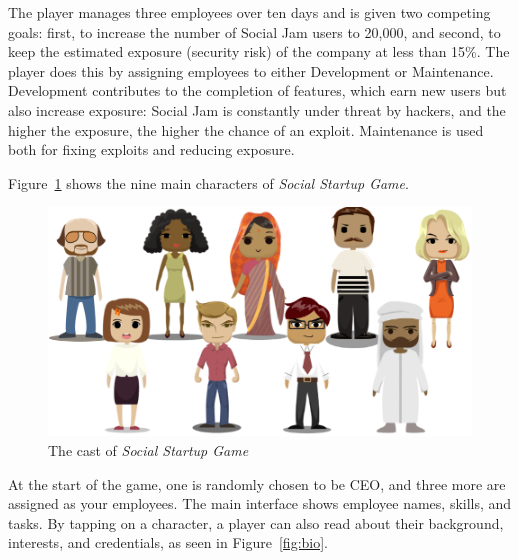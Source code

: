 \documentclass[letterpaper]{article}
\begin{document}
The player manages three employees over ten days and is given two 
competing goals: first, to increase the number of Social Jam users
to 20,000, and second, to keep the estimated exposure (security risk)
of the company at less than 15\%.
The player does this by assigning employees to either Development
or Maintenance. Development contributes to the completion of
features, which earn new users but also increase exposure:
Social Jam is constantly under threat by hackers, and the higher the
exposure, the higher the chance of an exploit. Maintenance 
is used both for fixing exploits and reducing exposure.


Figure~\ref{fig:cast} shows the nine main characters of
\textit{Social Startup Game}.
%
\begin{figure}\centering
\begin{framed}
\includegraphics[width=5in]{images/cast.png}
\caption{The cast of \textit{Social Startup Game}}
\label{fig:cast}
\end{framed}
\end{figure}
%
At the start of the game, one is randomly chosen to be CEO, and
three more are assigned as your employees.  
The main interface shows employee names, skills, and tasks.
By tapping on a character, a player can also read about their background,
interests, and credentials, as seen in Figure~\ref{fig:bio}.
%
\end{document}
